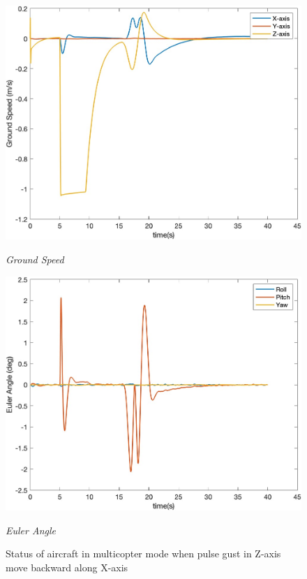 \begin{figure}[htbp]
  \begin{minipage}[b]{0.45\textwidth}
    \centering
    \includegraphics[width=\textwidth]{Images/Gust/VTOL pulse/3 groundspeed_4.jpg}
    \caption*{\textit{Ground Speed}}
  \end{minipage}
  \hfil
  \begin{minipage}[b]{0.45\textwidth}
    \centering
    \includegraphics[width=\textwidth]{Images/Gust/VTOL pulse/4 EulerAngle_4.jpg}
    \caption*{\textit{Euler Angle}}
  \end{minipage}
  \caption{Status of aircraft in multicopter mode when pulse gust in Z-axis move backward along X-axis}
  \label{fig:VTOL pulse z}
\end{figure}

